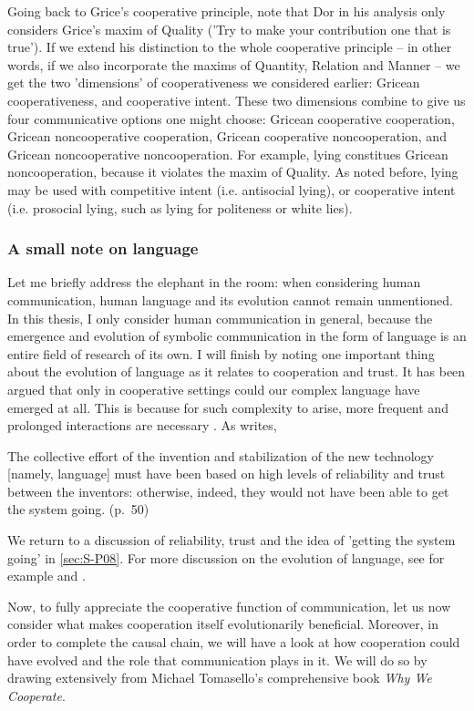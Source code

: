 Going back to Grice's cooperative principle, note that Dor in his analysis only considers Grice's maxim of Quality ('Try to make your contribution one that is true'). If we extend his distinction to the whole cooperative principle -- in other words, if we also incorporate the maxims of Quantity, Relation and Manner -- we get the two 'dimensions' of cooperativeness we considered earlier: Gricean cooperativeness, and cooperative intent.
These two dimensions combine to give us four communicative options one might choose: Gricean cooperative cooperation, Gricean noncooperative cooperation, Gricean cooperative noncooperation, and Gricean noncooperative noncooperation.
For example, lying constitues Gricean noncooperation, because it violates the maxim of Quality. As noted before, lying may be used with competitive intent (i.e. antisocial lying), or cooperative intent (i.e. prosocial lying, such as lying for politeness or white lies).

\subsubsection{A small note on language}

Let me briefly address the elephant in the room: when considering human communication, human language and its evolution cannot remain unmentioned. In this thesis, I only consider human communication in general, because the emergence and evolution of symbolic communication in the form of language is an entire field of research of its own.
I will finish by noting one important thing about the evolution of language as it relates to cooperation and trust. It has been argued that only in cooperative settings could our complex language have emerged at all. This is because for such complexity to arise, more frequent and prolonged interactions are necessary \citep{Benitez21}. As \citet{Dor17} writes,
\begin{quoting}
    The collective effort of the invention and stabilization of the new technology [namely, language] must have been based on high levels of reliability and trust between the inventors: otherwise, indeed, they would not have been able to get the system going.
    \hfill (p.~50)
\end{quoting}
We return to a discussion of reliability, trust and the idea of 'getting the system going' in \cref{sec:S-P08}. For more discussion on the evolution of language, see for example \citet{Tomasello08} and \citet{Dor17}.

Now, to fully appreciate the cooperative function of communication, let us now consider what makes cooperation itself evolutionarily beneficial. Moreover, in order to complete the causal chain, we will have a look at how cooperation could have evolved and the role that communication plays in it. We will do so by drawing extensively from Michael Tomasello's comprehensive \citeyear{Tomasello09} book \emph{Why We Cooperate}.

